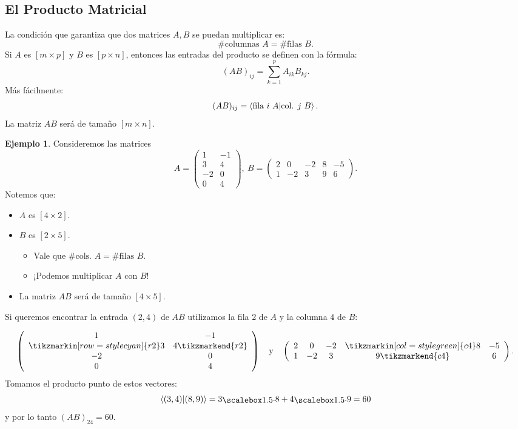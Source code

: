 \documentclass[12pt]{article}
\theoremstyle{plain}
\theoremstyle{definition}
\newtheorem{Ex}[Th]{Ejemplo}           %
\theoremstyle{remark}
\newcommand{\x}{\times}             %
\renewcommand{\:}{\colon}           %
\renewcommand{\.}{\Cdot}                %
\begin{document}
\begin{multicols}{2}

\subsection*{El Producto Matricial}

La condición que garantiza que dos matrices $A,B$ se puedan multiplicar es:
$$\#\text{columnas } A = \#\text{filas }B.$$ 
Si $A$ es $[m\x p]$ y $B$ es $[p\x n]$, entonces las entradas del producto se definen con la fórmula:
$$(AB)_{ij}=\sum_{k=1}^p A_{ik}B_{kj}.$$
Más fácilmente:
$$(AB)_{ij}=\braket{\text{fila }i\ A}{\text{col. }j\ B}.$$
La matriz $AB$ será de tamaño $[m\x n]$.

\begin{Ex}
Consideremos las matrices
$$A=\begin{pmatrix}
    1&-1\\
    3&4\\
    -2&0\\
    0&4
\end{pmatrix},\ B=\begin{pmatrix}
    2&0&-2&8&-5\\
    1&-2&3&9&6
\end{pmatrix}.$$ 
Notemos que:
\begin{itemize}
    \item $A$ es $[4\x 2]$.
    \item $B$ es $[2\x 5]$.
    \begin{itemize}
        \item Vale que $\#\text{cols. } A = \#\text{filas }B$.
        \item ¡Podemos multiplicar $A$ con $B$!
    \end{itemize}
    \item La matriz $AB$ será de tamaño $[4\x 5]$.
\end{itemize}
Si queremos encontrar la entrada $(2,4)$ de $AB$ utilizamos la fila 2 de $A$ y la columna $4$ de $B$:

$$
\left(\begin{array}{cc}
    1&-1\\
    \tikzmarkin[row=style cyan]{r2}3&4\tikzmarkend{r2}\\
    -2&0\\
    0&4
  \end{array}\right)\quad\text{y}\quad
  \left(\begin{array}{ccccc}
    2&0&-2&\tikzmarkin[col=style green]{c4}8&-5\\
    1&-2&3&9\tikzmarkend{c4}&6
  \end{array}\right).
$$
Tomamos el producto punto de estos vectores:
$$\braket{(3,4)}{(8,9)}=3\.8+4\.9=60$$
y por lo tanto $(AB)_{24}=60.$
\end{Ex}


\end{multicols}
\end{document}
